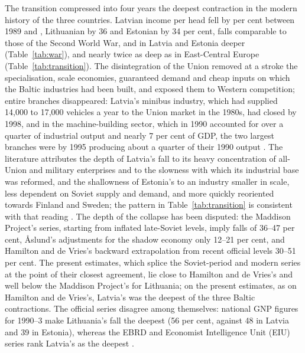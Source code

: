 The transition compressed into four years the deepest contraction in the modern history of the three countries. Latvian income per head fell by \lvTROUGHpct{} per cent between 1989 and \lvTROUGHyear{}, Lithuanian by 36 and Estonian by 34 per cent, falls comparable to those of the Second World War, and in Latvia and Estonia deeper (Table~\ref{tab:war}), and nearly twice as deep as in East-Central Europe (Table~\ref{tab:transition}). The disintegration of the Union removed at a stroke the specialisation, scale economies, guaranteed demand and cheap inputs on which the Baltic industries had been built, and exposed them to Western competition; entire branches disappeared: Latvia's minibus industry, which had supplied 14,000 to 17,000 vehicles a year to the Union market in the 1980s, had closed by 1998, and in the machine-building sector, which in 1990 accounted for over a quarter of industrial output and nearly 7 per cent of GDP, the two largest branches were by 1995 producing about a quarter of their 1990 output \parencites[39]{klimantas2025thesis}[305]{gatis_lv_eh}[925--9]{silins_2017_metalapstrade}. The literature attributes the depth of Latvia's fall to its heavy concentration of all-Union and military enterprises and to the slowness with which its industrial base was reformed, and the shallowness of Estonia's to an industry smaller in scale, less dependent on Soviet supply and demand, and more quickly reoriented towards Finland and Sweden; the pattern in Table~\ref{tab:transition} is consistent with that reading \parencites[164--6]{norkus_restorations}[9]{transition_greenes}[115]{krumins_2024_makroekonomiska}. The depth of the collapse has been disputed: the Maddison Project's series, starting from inflated late-Soviet levels, imply falls of 36--47 per cent, Åslund's adjustments for the shadow economy only 12--21 per cent, and Hamilton and de Vries's backward extrapolation from recent official levels 30--51 per cent. The present estimates, which splice the Soviet-period and modern series at the point of their closest agreement, lie close to Hamilton and de Vries's and well below the Maddison Project's for Lithuania; on the present estimates, as on Hamilton and de Vries's, Latvia's was the deepest of the three Baltic contractions. The official series disagree among themselves: national GNP figures for 1990--3 make Lithuania's fall the deepest (56 per cent, against 48 in Latvia and 39 in Estonia), whereas the EBRD and Economist Intelligence Unit (EIU) series rank Latvia's as the deepest \parencites[96]{aage_1997_public}[13]{kukk_2014_road}[169]{kukk2005}.

